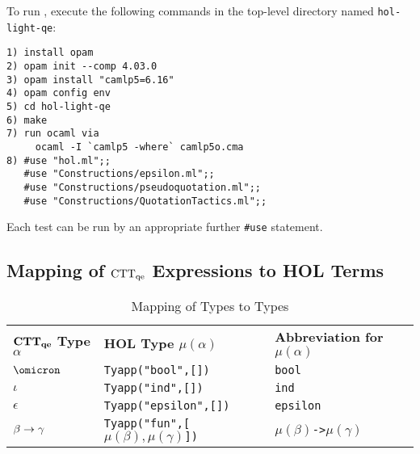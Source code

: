 \documentclass[fleqn]{llncs}
\begin{document}
To run {\HLQE}, execute the following commands in the {\HLQE}
top-level directory named \texttt{hol-light-qe}:

\begin{lstlisting}
1) install opam
2) opam init --comp 4.03.0                                                      
3) opam install "camlp5=6.16" 
4) opam config env
5) cd hol-light-qe
6) make
7) run ocaml via                                                                
     ocaml -I `camlp5 -where` camlp5o.cma                                        
8) #use "hol.ml";;
   #use "Constructions/epsilon.ml";;
   #use "Constructions/pseudoquotation.ml";;
   #use "Constructions/QuotationTactics.ml";;
\end{lstlisting}
\noindent Each test can be run by an appropriate further
\lstinline|#use| statement.

\subsection{Mapping of ${\rm CTT_{qe}}$ Expressions to HOL Terms}\label{subsec:mapping}

\begin{table}[b]
\bc
\begin{tabular}{|lll|}
\hline
\textbf{${\bf CTT_{qe}}$ Type $\alpha$} \hspace*{2ex}
  & \textbf{HOL Type $\mu(\alpha)$}
  & \textbf{Abbreviation for $\mu(\alpha)$}\\
$\omicron$ & \texttt{Tyapp("bool",[])} & \texttt{bool}\\
$\iota$ & \texttt{Tyapp("ind",[])} & \texttt{ind}\\
$\epsilon$ & \texttt{Tyapp("epsilon",[])} & \texttt{epsilon}\\
$\beta \rightarrow \gamma$ 
  & \texttt{Tyapp("fun",[\mbox{$\mu(\beta),\mu(\gamma)$}])} \hspace*{2ex}
  & \texttt{\mbox{$\mu(\beta)$}->\mbox{$\mu(\gamma)$}}\\  
\hline
\end{tabular}
\ec
\caption{Mapping of {\churchqe} Types to {\HOL} Types}\label{tab:types} 
\end{table}
\end{document}
